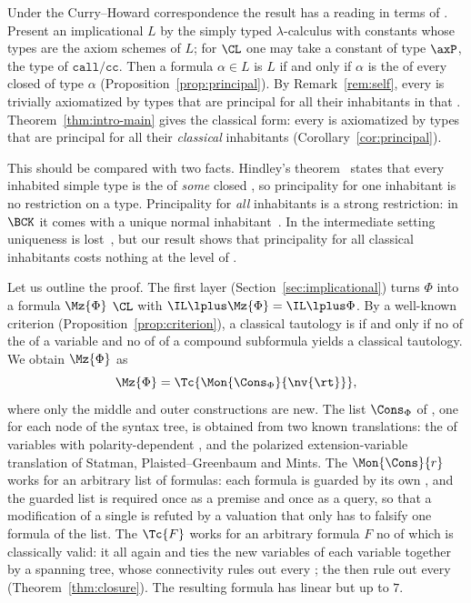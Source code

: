 Under the Curry--Howard correspondence the result has a reading in terms of
. Present an implicational  $L$
by the simply typed $\lambda$-calculus with constants whose types are the
axiom schemes of $L$; for $\CL$ one may take a constant of type $\axP$, the
type of $\mathtt{call/cc}$. Then a formula $\alpha\in L$ is 
$L$ if and only if $\alpha$ is the  of every closed
 of type $\alpha$ (Proposition~\ref{prop:principal}). By
Remark~\ref{rem:self}, every  is trivially axiomatized by types
that are principal for all their inhabitants in that .
Theorem~\ref{thm:intro-main} gives the classical form: every
 is axiomatized by types that are principal for all
their \emph{classical} inhabitants (Corollary~\ref{cor:principal}).

This should be compared with two facts. Hindley's theorem~\cite{Hin69}
states that every inhabited simple type is the  of
\emph{some} closed , so principality for one inhabitant is no
restriction on a type. Principality for \emph{all} inhabitants is a strong
restriction: in $\BCK$ it comes with a unique normal
inhabitant~\cite{Hir92,Tat06}. In the intermediate setting uniqueness is
lost~\cite{Tat93}, but our result shows that principality for all classical
inhabitants costs nothing at the level of .

Let us outline the proof. The first layer (Section~\ref{sec:implicational})
turns $\Phi$ into a formula $\Mz{\Phi}$  $\CL$ with
$\IL\lplus\Mz{\Phi}=\IL\lplus\Phi$. By a well-known criterion
(Proposition~\ref{prop:criterion}), a classical tautology is  if
and only if no  of the  of a variable and no
 of  of a compound subformula yields a
classical tautology. We obtain $\Mz{\Phi}$ as
\[
\Mz{\Phi}=\Tc{\Mon{\Cons_\Phi}{\nv{\rt}}},
\]
where only the middle and outer constructions are new. The list
$\Cons_\Phi$ of , one for each node of the syntax
tree, is obtained from two known translations:  the
 of variables with polarity-dependent , and the
polarized extension-variable translation of Statman, Plaisted--Greenbaum
and Mints. The  $\Mon{\Cons}{r}$ works for an arbitrary list
of  formulas: each formula is guarded by its own
, and the guarded list is required once as a premise and once
as a query, so that a modification of a single  is refuted by
a valuation that only has to falsify one formula of the list. The
 $\Tc{F}$ works for an arbitrary formula $F$ no
 of which is classically valid: it  all
 again and ties the new variables of each variable together
by a spanning tree, whose connectivity rules out every ; the
 then rule out every 
(Theorem~\ref{thm:closure}). The resulting formula has linear  but
 up to $7$.

